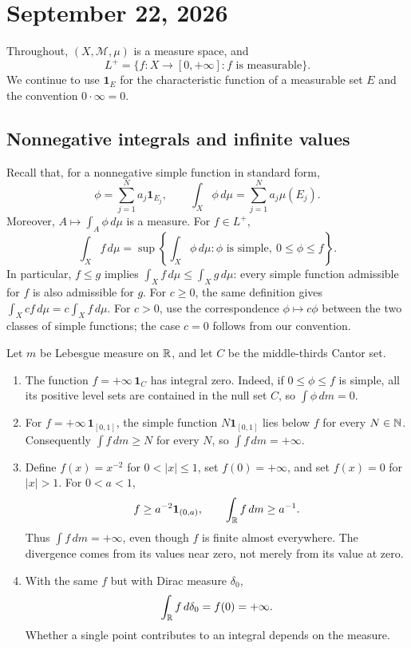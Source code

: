 \section{September 22, 2026}

Throughout, $(X,\mathcal M,\mu)$ is a measure space, and
\[
  L^+=\{f\colon X\to[0,+\infty]:f\text{ is measurable}\}.
\]
We continue to use $\mathbf 1_E$ for the characteristic function of a
measurable set $E$ and the convention $0\cdot\infty=0$.

\subsection{Nonnegative integrals and infinite values}

Recall that, for a nonnegative simple function in standard form,
\[
  \phi=\sum_{j=1}^N a_j\mathbf 1_{E_j},
  \qquad
  \int_X\phi\,d\mu=\sum_{j=1}^N a_j\mu(E_j).
\]
Moreover, $A\mapsto\int_A\phi\,d\mu$ is a measure. For $f\in L^+$,
\[
  \int_X f\,d\mu
  =\sup\left\{\int_X\phi\,d\mu:
    \phi\text{ is simple},\ 0\leq\phi\leq f\right\}.
\]
In particular, $f\leq g$ implies $\int_X f\,d\mu\leq\int_X g\,d\mu$:
every simple function admissible for $f$ is also admissible for $g$.
For $c\geq0$, the same definition gives
$\int_X cf\,d\mu=c\int_X f\,d\mu$. For $c>0$, use the correspondence
$\phi\mapsto c\phi$ between the two classes of simple functions; the
case $c=0$ follows from our convention.

\begin{example}
  Let $m$ be Lebesgue measure on $\mathbb{R}$, and let $C$ be the
  middle-thirds Cantor set.
  \begin{enumerate}[label=(\roman*)]
    \item The function $f=+\infty\,\mathbf 1_C$ has integral zero.
      Indeed, if $0\leq\phi\leq f$ is simple, all its positive level
      sets are contained in the null set $C$, so $\int\phi\,dm=0$.
    \item For $f=+\infty\,\mathbf 1_{[0,1]}$, the simple function
      $N\mathbf 1_{[0,1]}$ lies below $f$ for every $N\in\mathbb{N}$.
      Consequently $\int f\,dm\geq N$ for every $N$, so
      $\int f\,dm=+\infty$.
    \item Define $f(x)=x^{-2}$ for $0<|x|\leq1$, set $f(0)=+\infty$,
      and set $f(x)=0$ for $|x|>1$. For $0<a<1$,
      \[
        f\geq a^{-2}\mathbf 1_{(0,a)},
        \qquad \int_{\mathbb{R}}f\,dm\geq a^{-1}.
      \]
      Thus $\int f\,dm=+\infty$, even though $f$ is finite almost
      everywhere. The divergence comes from its values near zero,
      not merely from its value at zero.
    \item With the same $f$ but with Dirac measure $\delta_0$,
      \[
        \int_{\mathbb{R}}f\,d\delta_0=f(0)=+\infty.
      \]
      Whether a single point contributes to an integral depends on
      the measure.
  \end{enumerate}
\end{example}

